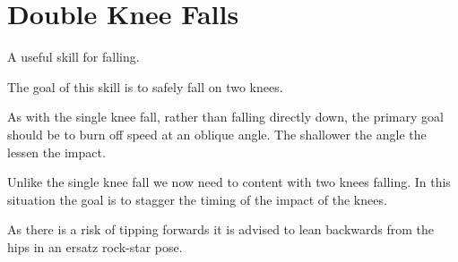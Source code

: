 \section{Double Knee Falls}
\label{sec:falls/double_knee}

A useful skill for falling.

The goal of this skill is to safely fall on two knees. 

As with the single knee fall, rather than falling directly down, the primary goal should be to burn off speed at an oblique angle. 
The shallower the angle the lessen the impact. 

Unlike the single knee fall we now need to content with two knees falling.
In this situation the goal is to stagger the timing of the impact of the knees. 

As there is a risk of tipping forwards it is advised to lean backwards from the hips in an ersatz rock-star pose. 


